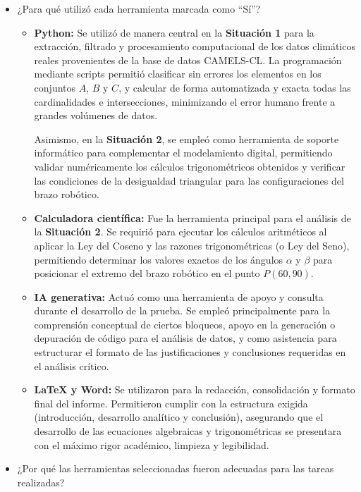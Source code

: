 \documentclass[12pt]{article}
\begin{document}
\begin{itemize}
	\item[a)] ¿Para qué utilizó cada herramienta marcada como ``Sí''?
		\begin{itemize}
    \item \textbf{Python:} Se utilizó de manera central en la \textbf{Situación 1} para la extracción, filtrado y procesamiento computacional de los datos climáticos reales provenientes de la base de datos CAMELS-CL. La programación mediante scripts permitió clasificar sin errores los elementos en los conjuntos $A$, $B$ y $C$, y calcular de forma automatizada y exacta todas las cardinalidades e intersecciones, minimizando el error humano frente a grandes volúmenes de datos.
    
    Asimismo, en la \textbf{Situación 2}, se empleó como herramienta de soporte informático para complementar el modelamiento digital, permitiendo validar numéricamente los cálculos trigonométricos obtenidos y verificar las condiciones de la desigualdad triangular para las configuraciones del brazo robótico.
    
    \item \textbf{Calculadora científica:} Fue la herramienta principal para el análisis de la \textbf{Situación 2}. Se requirió para ejecutar los cálculos aritméticos al aplicar la Ley del Coseno y las razones trigonométricas (o Ley del Seno), permitiendo determinar los valores exactos de los ángulos $\alpha$ y $\beta$ para posicionar el extremo del brazo robótico en el punto $P(60, 90)$.
    
    \item \textbf{IA generativa:} Actuó como una herramienta de apoyo y consulta durante el desarrollo de la prueba. Se empleó principalmente para la comprensión conceptual de ciertos bloqueos, apoyo en la generación o depuración de código para el análisis de datos, y como asistencia para estructurar el formato de las justificaciones y conclusiones requeridas en el análisis crítico.
    
    \item \textbf{LaTeX y Word:} Se utilizaron para la redacción, consolidación y formato final del informe. Permitieron cumplir con la estructura exigida (introducción, desarrollo analítico y conclusión), asegurando que el desarrollo de las ecuaciones algebraicas y trigonométricas se presentara con el máximo rigor académico, limpieza y legibilidad.
    
    \newpage
\end{itemize}
	\item[b)] ¿Por qué las herramientas seleccionadas fueron adecuadas para las tareas realizadas?
		

\end{itemize}
\end{document}
